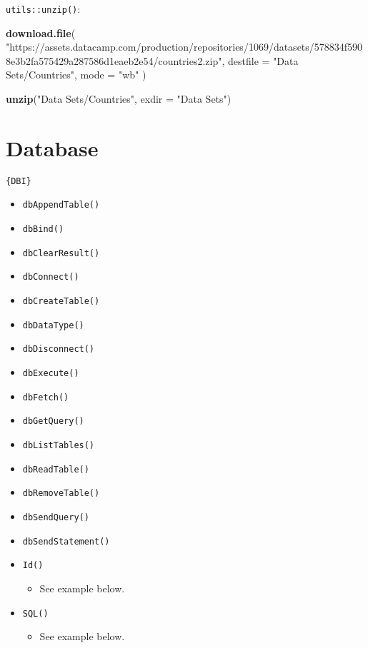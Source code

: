 \documentclass[
]{book}
\newenvironment{Shaded}{\begin{snugshade}}{\end{snugshade}}
\newcommand{\DataTypeTok}[1]{\textcolor[rgb]{0.13,0.29,0.53}{#1}}
\newcommand{\KeywordTok}[1]{\textcolor[rgb]{0.13,0.29,0.53}{\textbf{#1}}}
\newcommand{\NormalTok}[1]{#1}
\newcommand{\StringTok}[1]{\textcolor[rgb]{0.31,0.60,0.02}{#1}}
\providecommand{\tightlist}{%
  \setlength{\itemsep}{0pt}\setlength{\parskip}{0pt}}
\begin{document}
\texttt{utils::unzip()}:

\begin{Shaded}
\begin{Highlighting}[]
\KeywordTok{download.file}\NormalTok{(}
  \StringTok{"https://assets.datacamp.com/production/repositories/1069/datasets/578834f5908e3b2fa575429a287586d1eaeb2e54/countries2.zip"}\NormalTok{,}
  \DataTypeTok{destfile =} \StringTok{"Data Sets/Countries"}\NormalTok{,}
  \DataTypeTok{mode =} \StringTok{"wb"}
\NormalTok{)}

\KeywordTok{unzip}\NormalTok{(}\StringTok{"Data Sets/Countries"}\NormalTok{, }\DataTypeTok{exdir =} \StringTok{"Data Sets"}\NormalTok{)}
\end{Highlighting}
\end{Shaded}

\hypertarget{database}{%
\section{Database}\label{database}}

\texttt{\{DBI\}}

\begin{itemize}
\tightlist
\item
  \texttt{dbAppendTable()}
\item
  \texttt{dbBind()}
\item
  \texttt{dbClearResult()}
\item
  \texttt{dbConnect()}
\item
  \texttt{dbCreateTable()}
\item
  \texttt{dbDataType()}
\item
  \texttt{dbDisconnect()}
\item
  \texttt{dbExecute()}
\item
  \texttt{dbFetch()}
\item
  \texttt{dbGetQuery()}
\item
  \texttt{dbListTables()}
\item
  \texttt{dbReadTable()}
\item
  \texttt{dbRemoveTable()}
\item
  \texttt{dbSendQuery()}
\item
  \texttt{dbSendStatement()}
\item
  \texttt{Id()}

  \begin{itemize}
  \tightlist
  \item
    See example below.
  \end{itemize}
\item
  \texttt{SQL()}

  \begin{itemize}
  \tightlist
  \item
    See example below.
  \end{itemize}
\end{itemize}
\end{document}
